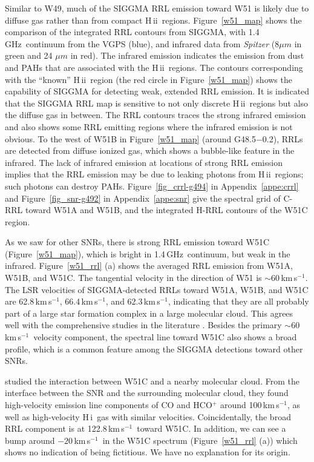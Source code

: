 \documentclass[manuscript]{aastex61}
\newcommand{\hii}{{\rm H\,}{{\sc ii}}}
\newcommand{\hi}{{\rm H\,}{{\sc i}}}
\newcommand{\kms}{\,km\,s$^{-1}$}
\newcommand{\ghz}{\,GHz}
\newcommand{\um}{\mu m}
\begin{document}
Similar to W49, much of the SIGGMA RRL emission toward W51 is likely due to diffuse gas rather than from compact \hii\ regions.
Figure~\ref{w51_map} shows the comparison of the integrated RRL contours from SIGGMA, with 1.4\ghz\ continuum from the VGPS (blue), and  infrared data from {\it Spitzer} (8$\um$ in green and 24 $\um$ in red).
The infrared emission indicates the emission from dust and PAHs that are associated with the \hii\ regions.
The contours corresponding with the ``known'' \hii\ region (the red circle in Figure~\ref{w51_map}) shows the capability of SIGGMA for detecting weak, extended RRL emission.
It is indicated that the SIGGMA RRL map is sensitive to not only discrete \hii\ regions but also the diffuse gas in between.
The RRL contours traces the strong infrared emission and also shows some RRL emitting regions where the infrared emission is not obvious.
To the west of W51B in Figure~\ref{w51_map} (around G48.5$-$0.2), RRLs are detected from diffuse ionized gas, which shows a bubble-like feature in the infrared.
The lack of infrared emission at locations of strong RRL emission implies that the RRL emission may be due to leaking photons from \hii\ regions; such photons can destroy PAHs.
Figure~\ref{fig_crrl-g494} in Appendix~\ref{appe:crrl} and Figure~\ref{fig_snr-g492} in Appendix~\ref {appe:snr} give the spectral grid of C-RRL toward W51A and W51B, and the integrated H-RRL contours of the W51C region.

As we saw for other SNRs, there is strong RRL emission toward W51C (Figure~\ref{w51_map}), which is bright in 1.4\ghz\ continuum, but weak in the infrared.
Figure~\ref{w51_rrl} (a) shows the averaged RRL emission from W51A, W51B, and W51C.
The tangential velocity in the direction of W51 is $\sim60$\kms.
The LSR velocities of SIGGMA-detected RRLs toward W51A, W51B, and W51C are 62.8\kms, 66.4\kms, and 62.3\kms, indicating that they are all probably part of a large star formation complex in a large molecular cloud.
This agrees well with the comprehensive studies in the literature \citep{Mufson1979, Mehringer1994, Brogan2013}.
Besides the primary $\sim60$\kms\ velocity component, the spectral line toward W51C also shows a broad profile, which is a common feature among the SIGGMA detections toward other SNRs.

\citet{Koo1997a, Koo1997b} studied the interaction between W51C and a nearby molecular cloud.
From the interface between the SNR and the surrounding molecular cloud, they found high-velocity emission line components of CO and HCO$^{+}$ around 100\kms, as well as high-velocity \hi\ gas with similar velocities.
Coincidentally, the broad RRL component is at 122.8\kms\ toward W51C.
In addition, we can see a bump around $-20$\kms\ in the W51C spectrum (Figure~\ref{w51_rrl} (a)) which shows no indication of being fictitious.  We have no explanation for its origin.
\end{document}
